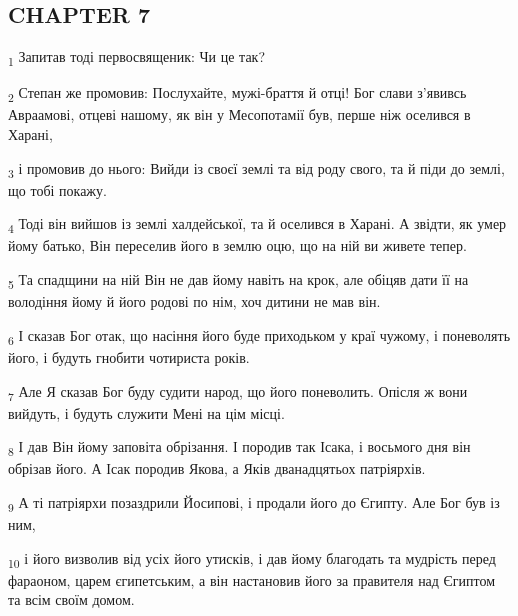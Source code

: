 \subsection{CHAPTER 7}
\begin{tcolorbox}
\textsubscript{1} Запитав тоді первосвященик: Чи це так?
\end{tcolorbox}
\begin{tcolorbox}
\textsubscript{2} Степан же промовив: Послухайте, мужі-браття й отці! Бог слави з'явивсь Авраамові, отцеві нашому, як він у Месопотамії був, перше ніж оселився в Харані,
\end{tcolorbox}
\begin{tcolorbox}
\textsubscript{3} і промовив до нього: Вийди із своєї землі та від роду свого, та й піди до землі, що тобі покажу.
\end{tcolorbox}
\begin{tcolorbox}
\textsubscript{4} Тоді він вийшов із землі халдейської, та й оселився в Харані. А звідти, як умер йому батько, Він переселив його в землю оцю, що на ній ви живете тепер.
\end{tcolorbox}
\begin{tcolorbox}
\textsubscript{5} Та спадщини на ній Він не дав йому навіть на крок, але обіцяв дати її на володіння йому й його родові по нім, хоч дитини не мав він.
\end{tcolorbox}
\begin{tcolorbox}
\textsubscript{6} І сказав Бог отак, що насіння його буде приходьком у краї чужому, і поневолять його, і будуть гнобити чотириста років.
\end{tcolorbox}
\begin{tcolorbox}
\textsubscript{7} Але Я сказав Бог буду судити народ, що його поневолить. Опісля ж вони вийдуть, і будуть служити Мені на цім місці.
\end{tcolorbox}
\begin{tcolorbox}
\textsubscript{8} І дав Він йому заповіта обрізання. І породив так Ісака, і восьмого дня він обрізав його. А Ісак породив Якова, а Яків дванадцятьох патріярхів.
\end{tcolorbox}
\begin{tcolorbox}
\textsubscript{9} А ті патріярхи позаздрили Йосипові, і продали його до Єгипту. Але Бог був із ним,
\end{tcolorbox}
\begin{tcolorbox}
\textsubscript{10} і його визволив від усіх його утисків, і дав йому благодать та мудрість перед фараоном, царем єгипетським, а він настановив його за правителя над Єгиптом та всім своїм домом.
\end{tcolorbox}
